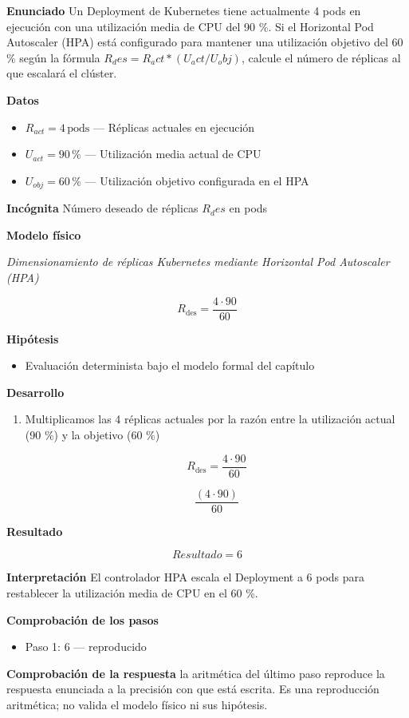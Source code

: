\documentclass{book}
\begin{document}
\begin{tcolorbox}[title={Problema resuelto}, studiumworked, breakable]

\noindent\textbf{Enunciado}
Un Deployment de Kubernetes tiene actualmente 4 pods en ejecución con una utilización media de CPU del 90 \%. Si el Horizontal Pod Autoscaler (HPA) está configurado para mantener una utilización objetivo del 60 \% según la fórmula \(R_des = R_act * (U_act / U_obj)\), calcule el número de réplicas al que escalará el clúster.

\noindent\textbf{Datos}
\begin{itemize}
\item $R_{act} = 4\,\mathrm{pods}$ — Réplicas actuales en ejecución
\item $U_{act} = 90\,\mathrm{\%}$ — Utilización media actual de CPU
\item $U_{obj} = 60\,\mathrm{\%}$ — Utilización objetivo configurada en el HPA
\end{itemize}

\noindent\textbf{Incógnita}
Número deseado de réplicas \(R_des\) en pods

\noindent\textbf{Modelo físico}

\noindent\textit{Dimensionamiento de réplicas Kubernetes mediante Horizontal Pod Autoscaler (HPA)}

\[
R_{\text{des}} = \frac{4 \cdot 90}{60}
\]

\noindent\textbf{Hipótesis}
\begin{itemize}
\item Evaluación determinista bajo el modelo formal del capítulo
\end{itemize}

\noindent\textbf{Desarrollo}
\begin{enumerate}
\item
Multiplicamos las 4 réplicas actuales por la razón entre la utilización actual (90 \%) y la objetivo (60 \%)

\[
R_{\text{des}} = \frac{4 \cdot 90}{60}
\]

\[
\frac{\left(4\cdot 90\right)}{60}
\]
\end{enumerate}

\noindent\textbf{Resultado}

\[
Resultado = 6
\]

\noindent\textbf{Interpretación}
El controlador HPA escala el Deployment a 6 pods para restablecer la utilización media de CPU en el 60 \%.

\noindent\textbf{Comprobación de los pasos}
\begin{itemize}
\item Paso 1: $6$ — reproducido
\end{itemize}

\noindent\textbf{Comprobación de la respuesta} la aritmética del último paso reproduce la respuesta enunciada a la precisión con que está escrita. Es una reproducción aritmética; no valida el modelo físico ni sus hipótesis.
\end{tcolorbox}
\end{document}
